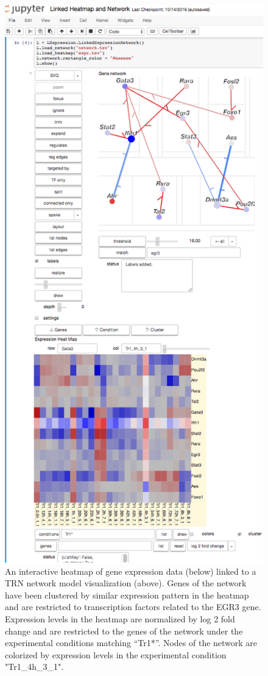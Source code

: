 \documentclass[10pt,letterpaper]{article}
\begin{document}
\begin{figure}[htb]
  \centering
  \includegraphics[width=.6\linewidth]{Linked}
  \caption{\label{Linked}
           An interactive heatmap of gene expression data (below) linked to a TRN network model visualization (above).  
           Genes of the network have been clustered by similar expression pattern in the heatmap and 
           are restricted to transcription factors related to the EGR3 gene.  Expression levels in the heatmap 
           are normalized by log 2 fold change and are restricted to 
           the genes of the network under the experimental conditions matching “Tr1*”.  Nodes of the network
           are colorized by expression levels in the experimental condition "Tr1\_4h\_3\_1".
  }
\end{figure}
\end{document}
